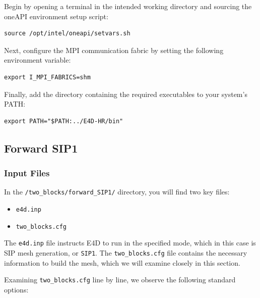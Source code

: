 \documentclass[a4paper,12pt]{article}
\begin{document}
Begin by opening a terminal in the intended working directory and sourcing the
oneAPI environment setup script:

\begin{verbatim}
source /opt/intel/oneapi/setvars.sh
\end{verbatim}

Next, configure the MPI communication fabric by setting the following
environment variable:

\begin{verbatim}
export I_MPI_FABRICS=shm
\end{verbatim}

Finally, add the directory containing the required executables to your system’s
PATH:

\begin{verbatim}
export PATH="$PATH:../E4D-HR/bin"
\end{verbatim}

\subsection{Forward SIP1}

\subsubsection{Input Files}

In the \texttt{/two\_blocks/forward\_SIP1/} directory, you will find two key
files:

\begin{itemize}
    \item \texttt{e4d.inp}
    \item \texttt{two\_blocks.cfg}
\end{itemize}

The \texttt{e4d.inp} file instructs E4D to run in the specified mode, which in
this case is SIP mesh generation, or \texttt{SIP1}. The \texttt{two\_blocks.cfg}
file contains the necessary information to build the mesh, which we will
examine closely in this section.

Examining \texttt{two\_blocks.cfg} line by line, we observe the following
standard options:
\end{document}
